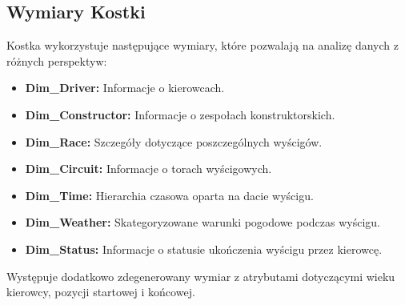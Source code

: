 \documentclass[a4paper,12pt]{article}
\begin{document}
\subsection{Wymiary Kostki}
Kostka wykorzystuje następujące wymiary, które pozwalają na analizę danych z różnych perspektyw:
\begin{itemize}
  \item \textbf{Dim\_Driver:} Informacje o kierowcach.
  \item \textbf{Dim\_Constructor:} Informacje o zespołach konstruktorskich.
  \item \textbf{Dim\_Race:} Szczegóły dotyczące poszczególnych wyścigów.
  \item \textbf{Dim\_Circuit:} Informacje o torach wyścigowych.
  \item \textbf{Dim\_Time:} Hierarchia czasowa oparta na dacie wyścigu.
  \item \textbf{Dim\_Weather:} Skategoryzowane warunki pogodowe podczas wyścigu.
  \item \textbf{Dim\_Status:} Informacje o statusie ukończenia wyścigu przez kierowcę.
\end{itemize}

Występuje dodatkowo zdegenerowany wymiar z atrybutami dotyczącymi wieku kierowcy, pozycji startowej i końcowej.
\end{document}
